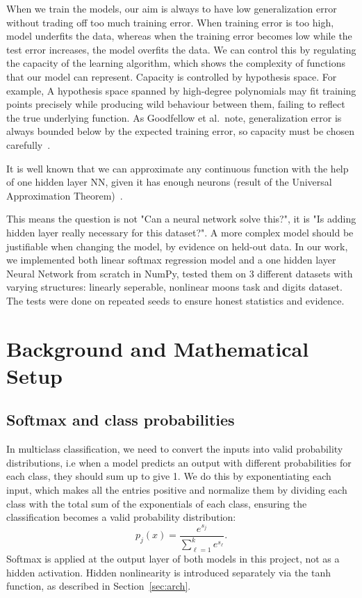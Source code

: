 \documentclass[11pt]{article}
\begin{document}
When we train the models, our aim is always to have low generalization error without trading off too much training error. When training error is too high, model underfits the data, whereas when the training error becomes low while the test error increases, the model overfits the data. We can control this by regulating the capacity of the learning algorithm, which shows the complexity of functions that our model can represent. Capacity is controlled by hypothesis space. For example, A hypothesis space spanned by high-degree polynomials may fit training points
precisely while producing wild behaviour between them, failing to reflect the true
underlying function. As Goodfellow et al.\ note, generalization error is always bounded
below by the expected training error, so capacity must be chosen carefully~\cite{goodfellow}.

It is well known that we can approximate any continuous function with the help of one hidden layer NN, given it has enough neurons (result of the Universal Approximation Theorem)~\cite{cs231n_nn1}. 

This means the question is not "Can a neural network solve this?", it is "Is adding hidden layer really necessary for this dataset?". A more complex model should be justifiable when changing the model, by evidence on held-out data. In our work, we implemented both linear softmax regression model and a one hidden layer Neural Network from scratch in NumPy, tested them on 3 different datasets with varying structures: linearly seperable, nonlinear moons task and digits dataset. The tests were done on repeated seeds to ensure honest statistics and evidence. 

\section{Background and Mathematical Setup}

\subsection{Softmax and class probabilities}

In multiclass classification, we need to convert the inputs into valid probability distributions, i.e when a model predicts an output with different probabilities for each class, they should sum up to give 1. We do this by exponentiating each input, which makes all the entries positive and normalize them by dividing each class with the total sum of the exponentials of each class, ensuring the classification becomes a valid probability distribution:
\begin{equation}
    p_j(x) = \frac{e^{s_j}}{\sum_{\ell=1}^{k} e^{s_\ell}}.
\end{equation}
Softmax is applied at the output layer of both models in this project, not as a hidden
activation. Hidden nonlinearity is introduced separately via the tanh function, as
described in Section~\ref{sec:arch}.
\end{document}
